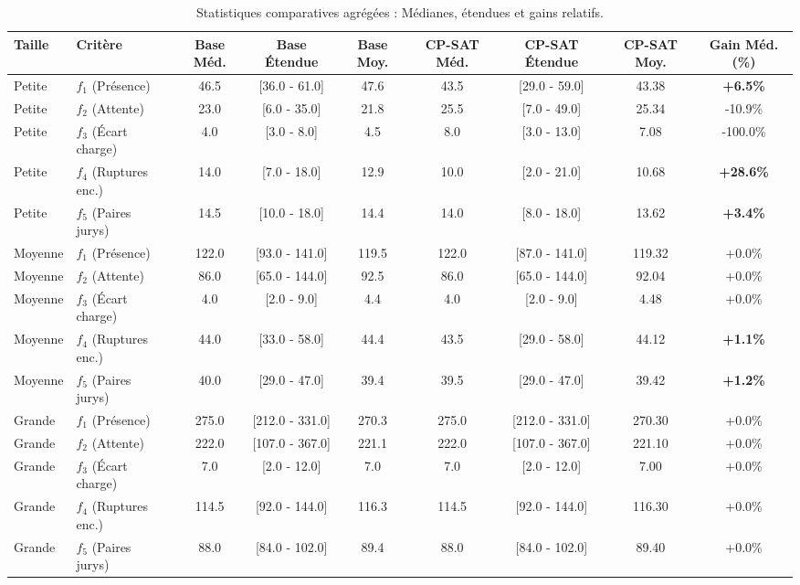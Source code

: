 \documentclass[10pt,a4paper]{article}
\begin{document}
\begin{table}[htbp]
\centering
\scriptsize
\caption{Statistiques comparatives agrégées : Médianes, étendues et gains relatifs.}
\label{tab:synthese}
\vspace{0.15cm}
\begin{tabularx}{\linewidth}{llccccccc}
\toprule
\textbf{Taille} & \textbf{Critère} & \textbf{Base Méd.} & \textbf{Base Étendue} & \textbf{Base Moy.} & \textbf{CP-SAT Méd.} & \textbf{CP-SAT Étendue} & \textbf{CP-SAT Moy.} & \textbf{Gain Méd. (\%)} \\
\midrule
Petite & $f_1$ (Présence) & 46.5 & [36.0 - 61.0] & 47.6 & 43.5 & [29.0 - 59.0] & 43.38 & \textbf{+6.5\%} \\
Petite & $f_2$ (Attente) & 23.0 & [6.0 - 35.0] & 21.8 & 25.5 & [7.0 - 49.0] & 25.34 & -10.9\% \\
Petite & $f_3$ (Écart charge) & 4.0 & [3.0 - 8.0] & 4.5 & 8.0 & [3.0 - 13.0] & 7.08 & -100.0\% \\
Petite & $f_4$ (Ruptures enc.) & 14.0 & [7.0 - 18.0] & 12.9 & 10.0 & [2.0 - 21.0] & 10.68 & \textbf{+28.6\%} \\
Petite & $f_5$ (Paires jurys) & 14.5 & [10.0 - 18.0] & 14.4 & 14.0 & [8.0 - 18.0] & 13.62 & \textbf{+3.4\%} \\
\midrule
Moyenne & $f_1$ (Présence) & 122.0 & [93.0 - 141.0] & 119.5 & 122.0 & [87.0 - 141.0] & 119.32 & +0.0\% \\
Moyenne & $f_2$ (Attente) & 86.0 & [65.0 - 144.0] & 92.5 & 86.0 & [65.0 - 144.0] & 92.04 & +0.0\% \\
Moyenne & $f_3$ (Écart charge) & 4.0 & [2.0 - 9.0] & 4.4 & 4.0 & [2.0 - 9.0] & 4.48 & +0.0\% \\
Moyenne & $f_4$ (Ruptures enc.) & 44.0 & [33.0 - 58.0] & 44.4 & 43.5 & [29.0 - 58.0] & 44.12 & \textbf{+1.1\%} \\
Moyenne & $f_5$ (Paires jurys) & 40.0 & [29.0 - 47.0] & 39.4 & 39.5 & [29.0 - 47.0] & 39.42 & \textbf{+1.2\%} \\
\midrule
Grande & $f_1$ (Présence) & 275.0 & [212.0 - 331.0] & 270.3 & 275.0 & [212.0 - 331.0] & 270.30 & +0.0\% \\
Grande & $f_2$ (Attente) & 222.0 & [107.0 - 367.0] & 221.1 & 222.0 & [107.0 - 367.0] & 221.10 & +0.0\% \\
Grande & $f_3$ (Écart charge) & 7.0 & [2.0 - 12.0] & 7.0 & 7.0 & [2.0 - 12.0] & 7.00 & +0.0\% \\
Grande & $f_4$ (Ruptures enc.) & 114.5 & [92.0 - 144.0] & 116.3 & 114.5 & [92.0 - 144.0] & 116.30 & +0.0\% \\
Grande & $f_5$ (Paires jurys) & 88.0 & [84.0 - 102.0] & 89.4 & 88.0 & [84.0 - 102.0] & 89.40 & +0.0\% \\
\bottomrule
\end{tabularx}
\end{table}
\end{document}
